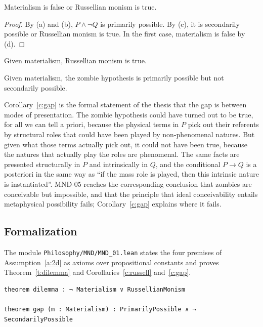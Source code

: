 \documentclass{situationist-preprint}
\begin{document}
\begin{theorem}\label{t:dilemma}
Materialism is false or Russellian monism is true.
\end{theorem}

\begin{proof}
By (a) and (b), $P \wedge \neg Q$ is primarily possible. By (c), it is secondarily possible or Russellian monism is true. In the first case, materialism is false by (d).
\end{proof}

\begin{corollary}\label{c:russell}
Given materialism, Russellian monism is true.
\end{corollary}

\begin{corollary}\label{c:gap}
Given materialism, the zombie hypothesis is primarily possible but not secondarily possible.
\end{corollary}

Corollary~\ref{c:gap} is the formal statement of the thesis that the gap is between modes of presentation. The zombie hypothesis could have turned out to be true, for all we can tell a priori, because the physical terms in $P$ pick out their referents by structural roles that could have been played by non-phenomenal natures. But given what those terms actually pick out, it could not have been true, because the natures that actually play the roles are phenomenal. The same facts are presented structurally in $P$ and intrinsically in $Q$, and the conditional $P \to Q$ is a posteriori in the same way as \enquote{if the mass role is played, then this intrinsic nature is instantiated}. MND-05 reaches the corresponding conclusion that zombies are conceivable but impossible, and that the principle that ideal conceivability entails metaphysical possibility fails; Corollary~\ref{c:gap} explains where it fails.

\subsection*{Formalization}

The module \nolinkurl{Philosophy/MND/MND_01.lean} states the four premises of Assumption~\ref{a:2d} as axioms over propositional constants and proves Theorem~\ref{t:dilemma} and Corollaries~\ref{c:russell} and~\ref{c:gap}.

\begin{lstlisting}
theorem dilemma : ¬ Materialism ∨ RussellianMonism

theorem gap (m : Materialism) : PrimarilyPossible ∧ ¬ SecondarilyPossible
\end{lstlisting}
\end{document}
